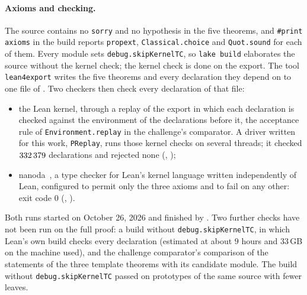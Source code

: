 \documentclass[11pt]{article}
\theoremstyle{definition}
\begin{document}
\begin{sloppypar}
\paragraph{Axioms and checking.}
The source contains no \texttt{sorry} and no hypothesis in the five
theorems, and \texttt{\#print axioms} in the build reports \texttt{propext},
\texttt{Classical.choice} and \texttt{Quot.sound} for each of them. Every
module sets \texttt{debug.skipKernelTC}, so \texttt{lake build} elaborates
the source without the kernel check; the kernel check is done on the export.
The tool \texttt{lean4export} writes the five theorems and every declaration
they depend on to one file of \qExport. Two checkers then check every
declaration of that file:
\begin{itemize}
\item the Lean kernel, through a replay of the export in which each
declaration is checked against the environment of the declarations before it,
the acceptance rule of \texttt{Environment.replay} in the challenge's
comparator. A driver written for this work, \texttt{PReplay}, runs those
kernel checks on several threads; it checked $332\,379$ declarations and
rejected none (\qReplayTime, \qReplayMem);
\item nanoda~\cite{nanoda}, a type checker for Lean's kernel language written
independently of Lean, configured to permit only the three axioms and to fail
on any other: exit code $0$ (\qNanodaTime, \qNanodaMem).
\end{itemize}
Both runs started on October 26, 2026 and finished by \qVerifiedDate. Two further checks have not been run on
the full proof: a build without \texttt{debug.skipKernelTC}, in which Lean's
own build checks every declaration (estimated at about $9$ hours and $33$\,GB
on the machine used), and the challenge comparator's comparison of the
statements of the three template theorems with its candidate module. The build without
\texttt{debug.skipKernelTC} passed on prototypes of the same source with fewer
leaves.


\end{sloppypar}
\end{document}
